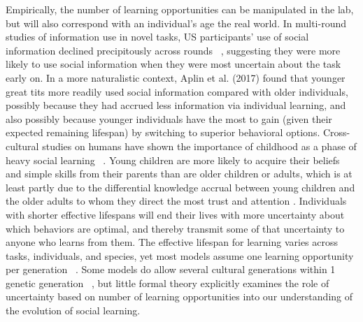 \documentclass[letterpaper,11.5pt]{scrartcl}
\newcommand{\mt}[1]{{\textcolor{myorange} {({\tiny MT:} #1)}}}
\newcommand{\ps}[1]{{\textcolor{mygreen} {({\tiny PS:} #1)}}}
\begin{document}
Empirically, the number of learning opportunities can be manipulated in the lab,
but will also correspond with an individual's age the real world. In multi-round
studies of information use in novel tasks, US participants' use of social
information declined precipitously across rounds ~\cite{McElreath2005}, suggesting
they were more likely to use social information when they were most uncertain
about the task early on. In a more naturalistic context, Aplin et al. (2017)
\nocite{Aplin2017} found that younger great tits more readily used social
information compared with older individuals, possibly because they had accrued
less information via individual learning, and also possibly because younger
individuals have the most to gain (given their expected remaining lifespan) by
switching to superior behavioral options. 
Cross-cultural studies on humans have shown the importance of childhood as a phase
of heavy social learning ~\cite{Reyes2016}. Young children are more likely to
acquire their beliefs and simple skills from their parents than are older children
or adults, which is at least partly due to the differential knowledge accrual
between young children and the older adults to whom they direct the most trust and
attention \cite{kline2013teaching}.
Individuals with shorter effective lifespans will end their lives with more
uncertainty about which behaviors are optimal, and thereby transmit some of that
uncertainty to anyone who learns from them. The effective lifespan for learning
varies across tasks, individuals, and species, yet most models assume one learning
opportunity per generation ~\cite{Feldman1996,Henrich1998, perreault2012bayesian}.
Some models do allow several cultural generations within 1 genetic generation
~\cite{Enquist2007}, but little formal theory explicitly examines the role of
uncertainty based on number of learning opportunities into our understanding of
the evolution of social learning. 

\end{document}
